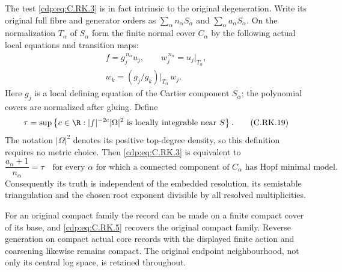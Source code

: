 \begin{proposition}
The test \eqref{cdp:eq:C.RK.3} is in fact intrinsic to
the original degeneration. Write its original
full fibre and generator orders as
$\sum_\alpha n_\alpha S_\alpha$ and
$\sum_\alpha a_\alpha S_\alpha$.
On the normalization $T_\alpha$ of $S_\alpha$
form the finite normal cover $C_\alpha$
by the following actual local equations
and transition maps:
\[
 \begin{gathered}
 f=g_j^{\,n_\alpha}u_j,\qquad
 w_j^{\,n_\alpha}=u_j|_{T_\alpha},\\
 w_k=(g_j/g_k)|_{T_\alpha}\,w_j .
 \end{gathered}
\tag{C.RK.18}\label{cdp:eq:C.RK.18}
\]
Here $g_j$ is a local defining equation
of the Cartier component $S_\alpha$;
the polynomial covers are normalized
after gluing. Define
\[
 \tau=\sup\left\{c\in\R:
       |f|^{-2c}|\Omega|^2\text{ is locally integrable
                              near }S\right\}.
\tag{C.RK.19}\label{cdp:eq:C.RK.19}
\]
The notation $|\Omega|^2$ denotes its
positive top-degree density, so this
definition requires no metric choice.
Then \eqref{cdp:eq:C.RK.3} is equivalent to
\[
 \frac{a_\alpha+1}{n_\alpha}=\tau
 \quad\text{for every }\alpha\text{ for which a connected
 component of }C_\alpha\text{ has Hopf minimal model}.
\tag{C.RK.20}\label{cdp:eq:C.RK.20}
\]
Consequently its truth is independent
of the embedded resolution, its
semistable triangulation and the
chosen root exponent divisible by
all resolved multiplicities.

For an original compact family the record can
be made on a finite compact cover of its base,
and \eqref{cdp:eq:C.RK.5} recovers the original compact
family. Reverse generation on compact actual
core records with the displayed finite action
and coarsening likewise remains compact.
The original endpoint neighbourhood, not only
its central log space, is retained throughout.
\end{proposition}

